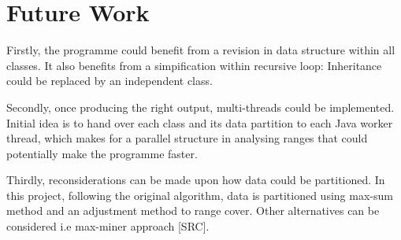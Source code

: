 \chapter{Future Work}	

Firstly, the programme could benefit from a revision in data structure within all classes. It also benefits from a simpification within recursive loop: Inheritance could be replaced by an independent class.

Secondly, once producing the right output, multi-threads could be implemented. Initial idea is to hand over each class and its data partition to each Java worker thread, which makes for a parallel structure in analysing ranges that could potentially make the programme faster.

Thirdly, reconsiderations can be made upon how data could be partitioned. In this project, following the original algorithm, data is partitioned using max-sum method and an adjustment method to range cover. Other alternatives can be considered i.e max-miner approach [SRC].